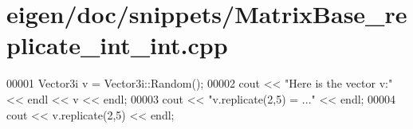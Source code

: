 \hypertarget{eigen_2doc_2snippets_2_matrix_base__replicate__int__int_8cpp_source}{}\section{eigen/doc/snippets/\+Matrix\+Base\+\_\+replicate\+\_\+int\+\_\+int.cpp}
\label{eigen_2doc_2snippets_2_matrix_base__replicate__int__int_8cpp_source}

\begin{DoxyCode}
00001 Vector3i v = Vector3i::Random();
00002 cout << \textcolor{stringliteral}{"Here is the vector v:"} << endl << v << endl;
00003 cout << \textcolor{stringliteral}{"v.replicate(2,5) = ..."} << endl;
00004 cout << v.replicate(2,5) << endl;
\end{DoxyCode}
